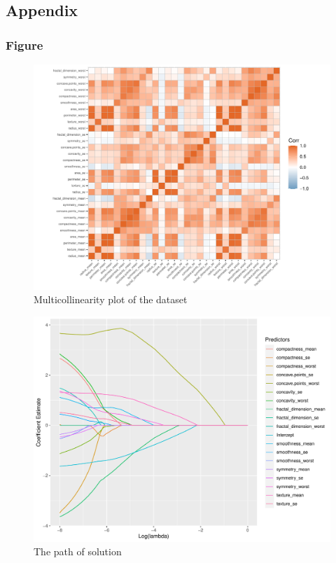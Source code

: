 \documentclass[]{article}
\begin{document}
\clearpage

\hypertarget{appendix}{%
\subsection{Appendix}\label{appendix}}

\hypertarget{figure}{%
\subsubsection{Figure}\label{figure}}

\begin{figure}[h]

{\centering \includegraphics[width=0.8\linewidth]{plot1} 

}

\caption{Multicollinearity plot of the dataset}\label{fig:unnamed-chunk-1}
\end{figure}

\begin{figure}[h]

{\centering \includegraphics[width=0.7\linewidth]{plot2} 

}

\caption{The path of solution}\label{fig:unnamed-chunk-2}
\end{figure}
\end{document}
